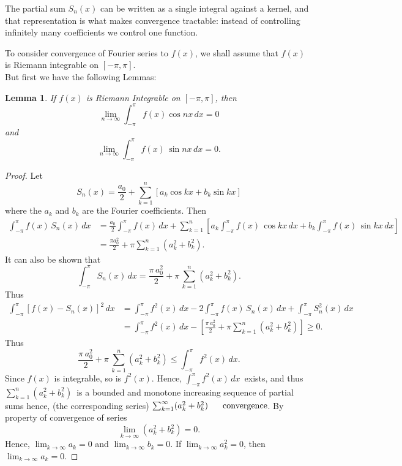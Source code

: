 \documentclass[12pt,a4paper]{report}
\theoremstyle{definition}
\theoremstyle{plain}
\newtheorem{lem}[thm]{Lemma}
\begin{document}
The partial sum $S_n(x)$ can be written as a single integral against a kernel,
and that representation is what makes convergence tractable: instead of
controlling infinitely many coefficients we control one function.

To consider convergence of Fourier series to $f(x)$, we shall assume that $f(x)$ is Riemann integrable on $[-\pi,\pi]$.\\
But first we have the following Lemmas:

\begin{lem}
If $f(x)$ is Riemann Integrable on $[-\pi,\pi]$, then $$\lim_{n\rightarrow \infty}\int_{-\pi}^{\pi} f(x)\cos nx\, dx = 0$$ and $$\lim_{n\rightarrow \infty}\int_{-\pi}^{\pi}f(x)\, \sin nx\, dx = 0.$$
\end{lem}

\begin{proof}
Let $$S_n(x) = \frac{a_0}{2} + \sum^n_{k = 1} \left[a_k\cos kx + b_k\sin kx\right]$$ where the $a_k$ and $b_k$ are the Fourier coefficients. Then
\begin{align*}
\int_{-\pi}^{\pi}f(x)\, S_n(x)\, dx & = \frac{a_0}{2}\int_{-\pi}^{\pi}f(x)\, dx + \sum^n_{k = 1}\left[a_k\int_{-\pi}^{\pi} f(x)\, \cos kx\, dx + b_k \int_{-\pi}^{\pi}f(x)\, \sin kx \, dx\right]\\
                                    & = \frac{\pi a_0^2}{2} + \pi \sum_{k = 1}^n(a^2_k + b_k^2).
\end{align*}
It can also be shown that
$$\int_{-\pi}^{\pi}S_n(x)\, dx = \frac{\pi \, a^2_0}{2} + \pi\, \sum_{k = 1}^n(a_k^2 + b_k^2).$$
Thus
\begin{align*}
\int_{-\pi}^{\pi}[f(x) - S_n(x)]^2\, dx & = \int_{-\pi}^{\pi}f^2(x)\, dx - 2\int_{-\pi}^{\pi} f(x)\, S_n(x)\, dx + \int_{-\pi}^{\pi} S^2_n(x)\, dx\\
& = \int_{-\pi}^{\pi} f^2(x)\, dx - \left[\frac{\pi\, a^2_0}{2} + \pi \sum^n_{k = 1}(a^2_k + b_k^2)\right] \geq 0.
\end{align*}
Thus $$\frac{\pi \, a_0^2}{2} + \pi \, \sum_{k = 1}^n(a^2_k + b_k^2) \leq \int^{\pi}_{-\pi} f^2 (x)\, dx.$$
Since $f(x)$ is integrable, so is $f^2(x)$. Hence, $\int_{-\pi}^{\pi}f^2(x)\, dx\,$ exists, and thus $\sum^n_{k = 1} (a^2_k + b^2_k)\,$ is a bounded and monotone increasing sequence of partial sums hence, (the corresponding series) $\sum_{k = 1}^{\infty}(a_k^2+b_k^2)\hspace{0.6cm}\text{convergence}$. By property of convergence of series $$\lim_{k\rightarrow \infty}\left(a^2_k + b^2_k\right) = 0.$$
Hence, $\lim_{k\rightarrow \infty} a_k = 0$ and $\lim_{k\rightarrow \infty} b_k = 0$. If $\lim_{k\rightarrow \infty} a^2_k = 0$, then $\lim_{k\rightarrow \infty} a_k = 0$.
\end{proof}
\end{document}
